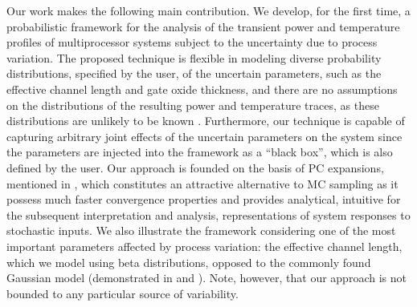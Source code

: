 Our work makes the following main contribution.
We develop, for the first time, a probabilistic framework for the analysis of the transient power and temperature profiles of multiprocessor systems subject to the uncertainty due to process variation.
The proposed technique is flexible in modeling diverse probability distributions, specified by the user, of the uncertain parameters, such as the effective channel length and gate oxide thickness, and there are no assumptions on the distributions of the resulting power and temperature traces, as these distributions are unlikely to be known \apriori.
Furthermore, our technique is capable of capturing arbitrary joint effects of the uncertain parameters on the system since the parameters are injected into the framework as a ``black box'', which is also defined by the user.
Our approach is founded on the basis of PC expansions, mentioned in , which constitutes an attractive alternative to MC sampling as it possess much faster convergence properties and provides analytical, intuitive for the subsequent interpretation and analysis, representations of system responses to stochastic inputs.
We also illustrate the framework considering one of the most important parameters affected by process variation: the effective channel length, which we model using beta distributions, opposed to the commonly found Gaussian model (demonstrated in  and ).
Note, however, that our approach is not bounded to any particular source of variability.
